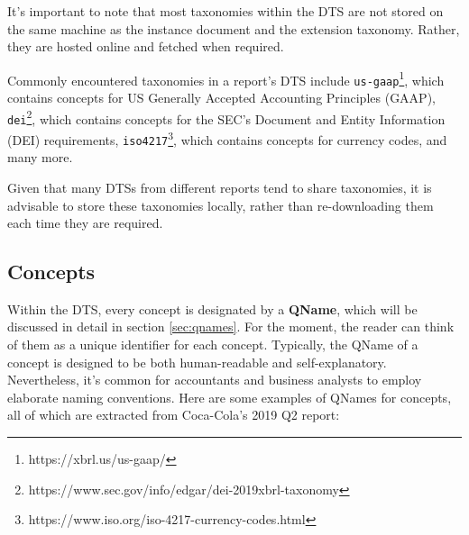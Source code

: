 
It's important to note that most taxonomies within the DTS are not stored on the same machine as the instance document and the extension taxonomy.
Rather, they are hosted online and fetched when required.

Commonly encountered taxonomies in a report's DTS include 
\texttt{us-gaap}\footnote{https://xbrl.us/us-gaap/}, which contains concepts for US Generally Accepted Accounting Principles (GAAP),
\texttt{dei}\footnote{https://www.sec.gov/info/edgar/dei-2019xbrl-taxonomy}, which contains concepts for the SEC's Document and Entity Information (DEI) requirements,
\texttt{iso4217}\footnote{https://www.iso.org/iso-4217-currency-codes.html}, which contains concepts for currency codes, 
and many more.




Given that many DTSs from different reports tend to share taxonomies, it is advisable to store these taxonomies locally,
rather than re-downloading them each time they are required.

\subsection{Concepts}

Within the DTS, every concept is designated by a \textbf{QName},
which will be discussed in detail in section \ref{sec:qnames}.
For the moment, the reader can think of them as a unique identifier for each concept.
Typically, the QName of a concept is designed to be both human-readable and self-explanatory.
Nevertheless, it's common for accountants and business analysts to employ elaborate naming conventions.
Here are some examples of QNames for concepts, all of which are extracted from Coca-Cola's 2019 Q2 report\cite{ko2019q2}:

